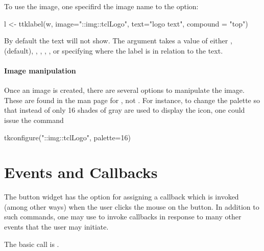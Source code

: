 To use the image, one specifird the image name to the
 option:
\begin{Schunk}
\begin{Sinput}
 l <- ttklabel(w, image="::img::tclLogo", text="logo text", 
               compound = "top")
\end{Sinput}
\end{Schunk}

By default the text will not show. The 
argument takes a value of either , 
(default), , , , ,
or  specifying where the label is in relation to the
text.

\paragraph{Image manipulation}
Once an image is created, there are several options to manipulate the
image. These are found in the \TK\/ man page for , not
. For instance, to change the palette so that instead of
 only 16 shades of gray are used to display the icon,
one could issue the command
\begin{Schunk}
\begin{Sinput}
 tkconfigure("::img::tclLogo", palette=16)
\end{Sinput}
\end{Schunk}




\section{Events and Callbacks}
\label{sec:tcltk:overview:events-callbacks}

The button widget has the  option for assigning a
callback which is invoked (among other ways) when the user clicks the
mouse on the button. In addition to such commands, one may use
 to invoke callbacks in response to many other events
that the user may initiate.

The basic call is . 


